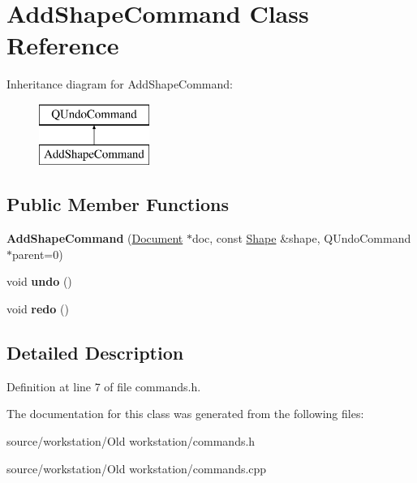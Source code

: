 \hypertarget{class_add_shape_command}{\section{Add\-Shape\-Command Class Reference}
\label{class_add_shape_command}
}
Inheritance diagram for Add\-Shape\-Command\-:\begin{figure}[H]
\begin{center}
\leavevmode
\includegraphics[height=2.000000cm]{class_add_shape_command}
\end{center}
\end{figure}
\subsection*{Public Member Functions}
\begin{DoxyCompactItemize}
\item 
\hypertarget{class_add_shape_command_a659eb893d5b0be92c00f8ae2da99e33b}{{\bfseries Add\-Shape\-Command} (\hyperlink{class_document}{Document} $\ast$doc, const \hyperlink{class_shape}{Shape} \&shape, Q\-Undo\-Command $\ast$parent=0)}\label{class_add_shape_command_a659eb893d5b0be92c00f8ae2da99e33b}

\item 
\hypertarget{class_add_shape_command_aa66316d115d6101c9579f06c9958ab23}{void {\bfseries undo} ()}\label{class_add_shape_command_aa66316d115d6101c9579f06c9958ab23}

\item 
\hypertarget{class_add_shape_command_acef9806f529fd6c8259d435e1935a5ff}{void {\bfseries redo} ()}\label{class_add_shape_command_acef9806f529fd6c8259d435e1935a5ff}

\end{DoxyCompactItemize}


\subsection{Detailed Description}


Definition at line 7 of file commands.\-h.



The documentation for this class was generated from the following files\-:\begin{DoxyCompactItemize}
\item 
source/workstation/\-Old workstation/commands.\-h\item 
source/workstation/\-Old workstation/commands.\-cpp\end{DoxyCompactItemize}
